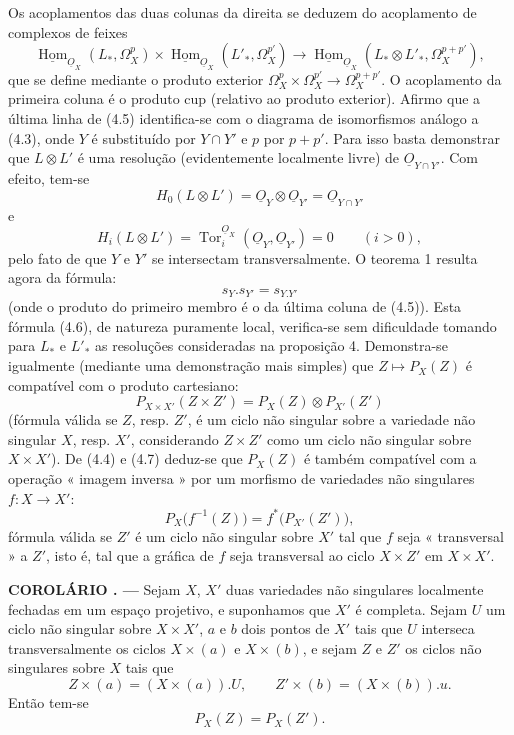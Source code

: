 \documentclass[11pt,twoside,openany]{book}
\numberwithin{equation}{section}
\newcommand{\src}[1]{%
  \phantomsection\hypertarget{src:#1}{}%
  \marginpar{\raggedleft\footnotesize\sffamily #1}%
}
\newcommand{\Osh}{\underline{O}}
\newcommand{\Homsh}{\underline{\operatorname{Hom}}}
\theoremstyle{plain}
\theoremstyle{definition}
\theoremstyle{remark}
\newcommand{\result}[2]{%
  \par\medskip\noindent\textbf{#1%
  \if\relax\detokenize{#2}\relax\else\space#2\fi. ---}\enspace
}
\newcommand{\FgaUnitKey}{frontmatter}
\renewcommand{\src}[1]{%
  \phantomsection\hypertarget{src:\FgaUnitKey:#1}{}%
  \marginpar{\raggedleft\footnotesize\sffamily #1}%
}
\begin{document}
\src{180}
Os acoplamentos das duas colunas da direita se deduzem do acoplamento de
complexos de feixes
\[
\Homsh_{\Osh_X}(L_{*},\Omega_X^{p})
\times\Homsh_{\Osh_X}(L'_{*},\Omega_X^{p'})
\longrightarrow
\Homsh_{\Osh_X}(L_{*}\otimes L'_{*},\Omega_X^{p+p'}),
\]
que se define mediante o produto exterior
$\Omega_X^{p}\times\Omega_X^{p'}\longrightarrow\Omega_X^{p+p'}$.
O acoplamento da primeira coluna é o produto cup (relativo ao produto
exterior). Afirmo que a última linha de (4.5) identifica-se com o diagrama
de isomorfismos análogo a (4.3), onde $Y$ é substituído por $Y\cap Y'$ e $p$ por
$p+p'$. Para isso basta demonstrar que $L\otimes L'$ é uma resolução
(evidentemente localmente livre) de $\Osh_{Y\cap Y'}$. Com efeito, tem-se
\[
  H_0(L\otimes L')=\Osh_Y\otimes\Osh_{Y'}=\Osh_{Y\cap Y'}
\]
e
\[
  H_i(L\otimes L')=\operatorname{Tor}_{i}^{\Osh_X}(\Osh_Y,\Osh_{Y'})=0
  \qquad(i>0),
\]
pelo fato de que $Y$ e $Y'$ se intersectam transversalmente. O teorema 1 resulta
agora da fórmula:
\begin{equation}\tag{4.6}
  s_Y.s_{Y'}=s_{Y.Y'}
\end{equation}
(onde o produto do primeiro membro é o da última coluna de (4.5)).
Esta fórmula (4.6), de natureza puramente local, verifica-se sem dificuldade
tomando para $L_{*}$ e $L'_{*}$ as resoluções consideradas na proposição
4. Demonstra-se igualmente (mediante uma demonstração mais simples) que
$Z\longmapsto P_X(Z)$ é compatível com o produto cartesiano:
\begin{equation}\tag{4.7}
  P_{X\times X'}(Z\times Z')=P_X(Z)\otimes P_{X'}(Z')
\end{equation}
(fórmula válida se $Z$, resp. $Z'$, é um ciclo não singular sobre a variedade
não singular $X$, resp. $X'$, considerando $Z\times Z'$ como um ciclo não
singular sobre $X\times X'$). De (4.4) e (4.7) deduz-se que $P_X(Z)$ é também
compatível com a operação « imagem inversa » por um morfismo de variedades não
singulares $f:X\longrightarrow X'$:
\begin{equation}\tag{4.8}
  P_X\bigl(f^{-1}(Z)\bigr)=f^{*}\bigl(P_{X'}(Z')\bigr),
\end{equation}
fórmula válida se $Z'$ é um ciclo não singular sobre $X'$ tal que $f$ seja
« transversal » a $Z'$, isto é, tal que a gráfica de $f$ seja transversal ao ciclo
$X\times Z'$ em $X\times X'$.

\src{181}
\result{COROLÁRIO}{1} Sejam $X$, $X'$ duas variedades não singulares
localmente fechadas em um espaço projetivo, e suponhamos que $X'$ é completa. Sejam $U$
um ciclo não singular sobre $X\times X'$, $a$ e $b$ dois pontos de $X'$ tais que
$U$ interseca transversalmente os ciclos $X\times(a)$ e $X\times(b)$, e sejam $Z$
e $Z'$ os ciclos não singulares sobre $X$ tais que
\[
  Z\times(a)=(X\times(a)).U,
  \qquad
  Z'\times(b)=(X\times(b)).u.
\]
Então tem-se
\[
  P_X(Z)=P_X(Z').
\]
\end{document}
